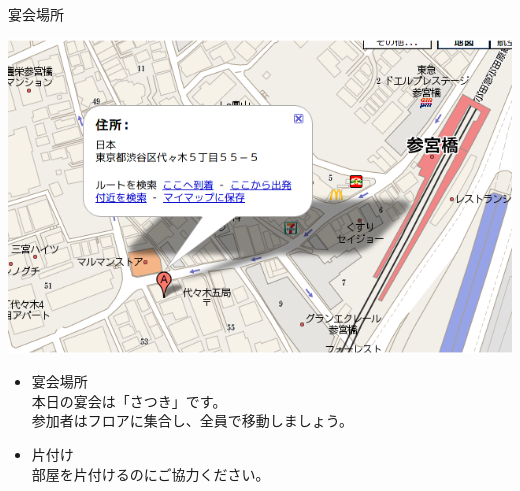 \documentclass[cjk,dvipdfmx,12pt]{beamer}
\begin{document}

\begin{frame}{宴会場所}
\begin{center}
 \includegraphics[width=0.7\hsize]{image200806/satsuki.png}
\end{center}

\begin{itemize}
 \item 宴会場所\\
       本日の宴会は「さつき」です。\\
       参加者はフロアに集合し、全員で移動しましょう。
 \item 片付け\\
       部屋を片付けるのにご協力ください。
\end{itemize}

\end{frame}
\end{document}
